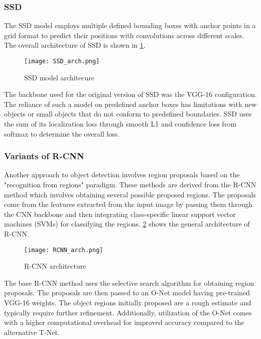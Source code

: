 \documentclass{article}
\begin{document}
\subsubsection{SSD}
\label{sec:SSD}

The SSD model employs multiple defined bounding boxes with anchor points in a grid format to predict their positions with convolutions across different scales. The overall architecture of SSD is shown in \cref{fig:ssdarch}. 

\begin{figure}[!htb]
\centering
\texttt{[image: SSD\_arch.png]}
\caption{SSD model architecure}
\label{fig:ssdarch}
\end{figure}

The backbone used for the original version of SSD was the VGG-16 configuration. The reliance of such a model on predefined anchor boxes has limitations with new objects or small objects that do not conform to predefined boundaries.
SSD uses the sum of its localization loss through smooth L1  and confidence loss from softmax to determine the overall loss.


\subsubsection{Variants of R-CNN}
\label{sec:R-CNN}

Another approach to object detection involves region proposals based on the "recognition from regions" paradigm. These methods are derived from the R-CNN method which involves obtaining several possible proposed regions. The proposals come from the features extracted from the input image by passing them through the CNN backbone and then integrating class-specific linear support vector machines (SVMs) for classifying the regions. \cref{fig:rcnn} shows the general architecture of R-CNN. 

\begin{figure}[!htb]
\centering
\texttt{[image: RCNN\_arch.png]}
\caption{R-CNN architecture}
\label{fig:rcnn}
\end{figure}

The base R-CNN method uses the selective search algorithm for obtaining region proposals. The proposals are then passed to an O-Net model having pre-trained VGG-16 weights. The object regions initially proposed are a rough estimate and typically require further refinement. Additionally, utilization of the O-Net comes with a higher computational overhead for improved accuracy compared to the alternative T-Net.
\end{document}
